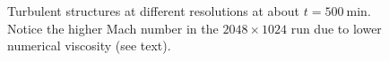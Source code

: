 \begin{figure}[t!]
  \centering
  \centering
      \hfill
    \caption{Turbulent structures at different resolutions at about $t=500 \ \mathrm{min}$. Notice the higher Mach number in the $2048 \times 1024$ run due to lower numerical viscosity (see text).}
    \label{fig:differentialmach}
 \end{figure}

